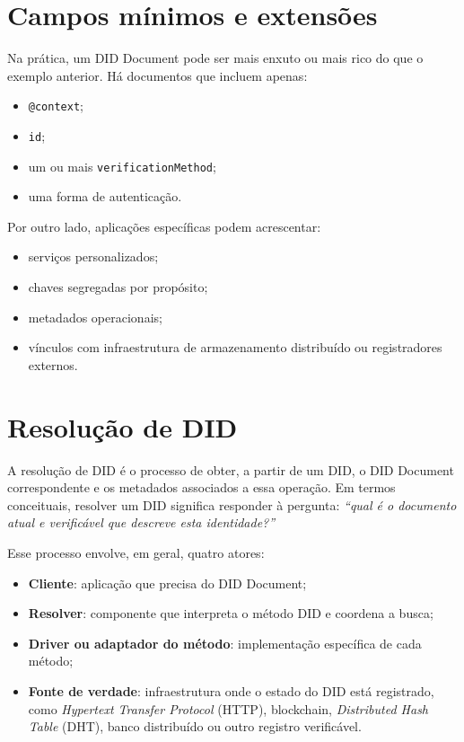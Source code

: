 \section{Campos mínimos e extensões}
Na prática, um DID Document pode ser mais enxuto ou mais rico do que o exemplo anterior. Há documentos que incluem apenas:
\begin{itemize}[leftmargin=*]
  \item \texttt{@context};
  \item \texttt{id};
  \item um ou mais \texttt{verificationMethod};
  \item uma forma de autenticação.
\end{itemize}

Por outro lado, aplicações específicas podem acrescentar:
\begin{itemize}[leftmargin=*]
  \item serviços personalizados;
  \item chaves segregadas por propósito;
  \item metadados operacionais;
  \item vínculos com infraestrutura de armazenamento distribuído ou registradores externos.
\end{itemize}

\section{Resolução de DID}
A resolução de DID é o processo de obter, a partir de um DID, o DID Document correspondente e os metadados associados a essa operação. Em termos conceituais, resolver um DID significa responder à pergunta: \textit{``qual é o documento atual e verificável que descreve esta identidade?''}

Esse processo envolve, em geral, quatro atores:
\begin{itemize}[leftmargin=*]
  \item \textbf{Cliente}: aplicação que precisa do DID Document;
  \item \textbf{Resolver}: componente que interpreta o método DID e coordena a busca;
  \item \textbf{Driver ou adaptador do método}: implementação específica de cada método;
  \item \textbf{Fonte de verdade}: infraestrutura onde o estado do DID está registrado, como \textit{Hypertext Transfer Protocol} (HTTP), blockchain, \textit{Distributed Hash Table} (DHT), banco distribuído ou outro registro verificável.
\end{itemize}

